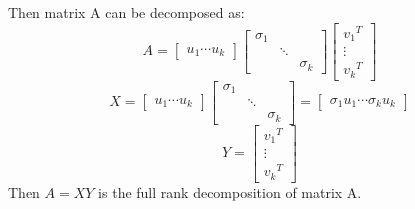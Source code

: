 \documentclass[]{article}
\begin{document}
Then matrix A can be decomposed as:
\begin{equation}
 A=\left[ \begin{matrix}
  u_{1} \cdots u_{k}
 \end{matrix}\right]
 \left[
 \begin{matrix}
 \sigma_{1}&&\\
 &\ddots&\\
 &&\sigma_{k}
 \end{matrix}\right]
 \left[
 \begin{matrix}
 {v_{1}}^{T}\\
 \vdots\\
 {v_{k}}^{T}
 \end{matrix}\right]
\end{equation}  
\begin{equation}
  X=\left[ \begin{matrix}
  u_{1} \cdots u_{k}
  \end{matrix}\right]
  \left[
  \begin{matrix}
  \sigma_{1}&&\\
  &\ddots&\\
  &&\sigma_{k}
  \end{matrix}\right]=\left[
  \begin{matrix}
  \sigma_{1}u_{1}\cdots \sigma_{k}u_{k}
  \end{matrix}\right]
\end{equation}
\begin{equation}
Y=\left[
\begin{matrix}
{v_{1}}^{T}\\
\vdots\\
{v_{k}}^{T}
\end{matrix}\right]
\end{equation}
Then $A=XY$ is the full rank decomposition of matrix A.
\end{document}
